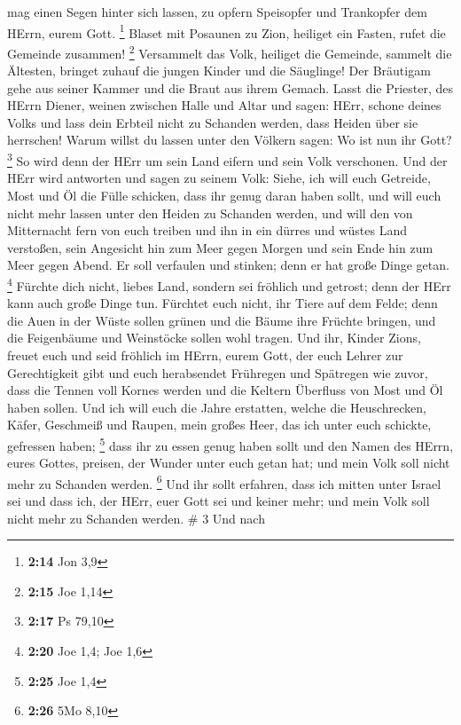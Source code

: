 mag einen Segen hinter sich lassen, zu opfern Speisopfer und Trankopfer
dem HErrn, eurem Gott. \footnote{\textbf{2:14} Jon 3,9} 
Blaset mit Posaunen zu Zion, heiliget ein Fasten, rufet die Gemeinde
zusammen! \footnote{\textbf{2:15} Joe 1,14}  Versammelt das
Volk, heiliget die Gemeinde, sammelt die Ältesten, bringet zuhauf die
jungen Kinder und die Säuglinge! Der Bräutigam gehe aus seiner Kammer
und die Braut aus ihrem Gemach.  Lasst die Priester, des
HErrn Diener, weinen zwischen Halle und Altar und sagen: HErr, schone
deines Volks und lass dein Erbteil nicht zu Schanden werden, dass Heiden
über sie herrschen! Warum willst du lassen unter den Völkern sagen: Wo
ist nun ihr Gott? \footnote{\textbf{2:17} Ps 79,10}  So
wird denn der HErr um sein Land eifern und sein Volk verschonen.
 Und der HErr wird antworten und sagen zu seinem Volk:
Siehe, ich will euch Getreide, Most und Öl die Fülle schicken, dass ihr
genug daran haben sollt, und will euch nicht mehr lassen unter den
Heiden zu Schanden werden,  und will den von Mitternacht
fern von euch treiben und ihn in ein dürres und wüstes Land verstoßen,
sein Angesicht hin zum Meer gegen Morgen und sein Ende hin zum Meer
gegen Abend. Er soll verfaulen und stinken; denn er hat große Dinge
getan. \footnote{\textbf{2:20} Joe 1,4; Joe 1,6}  Fürchte
dich nicht, liebes Land, sondern sei fröhlich und getrost; denn der HErr
kann auch große Dinge tun.  Fürchtet euch nicht, ihr Tiere
auf dem Felde; denn die Auen in der Wüste sollen grünen und die Bäume
ihre Früchte bringen, und die Feigenbäume und Weinstöcke sollen wohl
tragen.  Und ihr, Kinder Zions, freuet euch und seid
fröhlich im HErrn, eurem Gott, der euch Lehrer zur Gerechtigkeit gibt
und euch herabsendet Frühregen und Spätregen wie zuvor, 
dass die Tennen voll Kornes werden und die Keltern Überfluss von Most
und Öl haben sollen.  Und ich will euch die Jahre
erstatten, welche die Heuschrecken, Käfer, Geschmeiß und Raupen, mein
großes Heer, das ich unter euch schickte, gefressen haben; \footnote{\textbf{2:25}
  Joe 1,4}  dass ihr zu essen genug haben sollt und den
Namen des HErrn, eures Gottes, preisen, der Wunder unter euch getan hat;
und mein Volk soll nicht mehr zu Schanden werden. \footnote{\textbf{2:26}
  5Mo 8,10}  Und ihr sollt erfahren, dass ich mitten unter
Israel sei und dass ich, der HErr, euer Gott sei und keiner mehr; und
mein Volk soll nicht mehr zu Schanden werden. \# 3  Und nach
